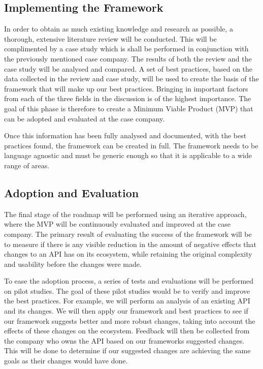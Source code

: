 \documentclass{article}
\begin{document}
\subsection{Implementing the Framework}
In order to obtain as much existing knowledge and research as possible, a thorough, extensive literature review will be conducted. This will be complimented by a case study which is shall be performed in conjunction with the previously mentioned case company. The results of both the review and the case study will be analysed and compared. A set of best practices, based on the data collected in the review and case study, will be used to create the basis of the framework that will make up our best practices. Bringing in important factors from each of the three fields in the discussion is of the highest importance. The goal of this phase is therefore to create a Minimum Viable Product (MVP) that can be adopted and evaluated at the case company. \smallskip

Once this information has been fully analysed and documented, with the best practices found, the framework can be created in full. The framework needs to be language agnostic and must be generic enough so that it is applicable to a wide range of areas. 

\subsection{Adoption and Evaluation}
The final stage of the roadmap will be performed using an iterative approach, where the MVP will be continuously evaluated and improved at the case company. The primary result of evaluating the success of the framework will be to measure if there is any visible reduction in the amount of negative effects that changes to an API has on its ecosystem, while retaining the original complexity and usability before the changes were made. \smallskip

To ease the adoption process, a series of tests and evaluations will be performed on pilot studies. The goal of these pilot studies would be to verify and improve the best practices. For example, we will perform an analysis of an existing API and its changes. We will then apply our framework and best practices to see if our framework suggests better and more robust changes, taking into account the effects of these changes on the ecosystem. Feedback will then be collected from the company who owns the API based on our frameworks suggested changes. This will be done to determine if our suggested changes are achieving the same goals as their changes would have done.
\end{document}

